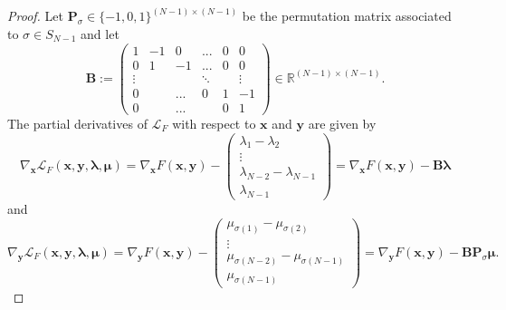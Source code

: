 \begin{proof} Let $\textbf{P}_{\sigma} \in \{ -1,0,1 \}^{(N-1)\times(N-1)}$ be the permutation matrix associated to $\sigma \in S_{N-1}$ and let
\begin{equation*}
    \textbf{B} := 
    \begin{pmatrix}
        1&-1&0&...&0&0\\
        0&1&-1&...&0&0\\
        \vdots& & &\ddots& &\vdots\\
        0& &...&0&1&-1\\
        0& &...& &0&1
    \end{pmatrix} \in \mathbb{R}^{(N-1)\times(N-1)}.
\end{equation*}
The partial derivatives of $\mathcal{L}_F$ with respect to $\textbf{x}$ and $\textbf{y}$ are given by
\begin{equation*}
    \nabla_{\textbf{x}}\mathcal{L}_F(\textbf{x},\textbf{y},\bm{\lambda},\bm{\mu}) = \nabla_{\textbf{x}}F(\textbf{x},\textbf{y}) - 
    \begin{pmatrix}
        \lambda_1 - \lambda_2\\
        \vdots\\
        \lambda_{N-2} - \lambda_{N-1}\\
        \lambda_{N-1}
    \end{pmatrix}
    = \nabla_{\textbf{x}}F(\textbf{x},\textbf{y}) - \textbf{B}\bm{\lambda}
\end{equation*}
and
\begin{equation*}
    \nabla_{\textbf{y}}\mathcal{L}_F(\textbf{x},\textbf{y},\bm{\lambda},\bm{\mu}) = \nabla_{\textbf{y}}F(\textbf{x},\textbf{y}) - 
    \begin{pmatrix}
        \mu_{\sigma(1)} - \mu_{\sigma(2)}\\
        \vdots\\
        \mu_{\sigma(N-2)} - \mu_{\sigma(N-1)}\\
        \mu_{\sigma(N-1)}
    \end{pmatrix}
    = \nabla_{\textbf{y}}F(\textbf{x},\textbf{y}) - \textbf{B}\textbf{P}_{\sigma}\bm{\mu}.
\end{equation*}


\end{proof}
